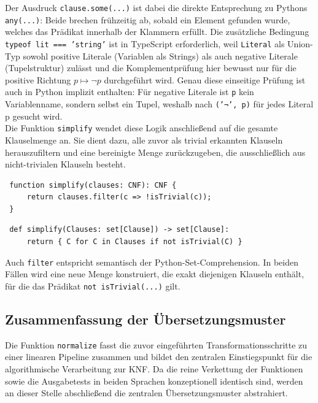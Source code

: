 Der Ausdruck \texttt{clause.some(...)} ist dabei die direkte Entsprechung zu Pythons \texttt{any(...)}: Beide brechen frühzeitig ab, sobald ein Element gefunden wurde, welches das Prädikat innerhalb der Klammern erfüllt. 
Die zusätzliche Bedingung \texttt{typeof lit === 'string'} ist in TypeScript erforderlich, weil \texttt{Literal} als Union-Typ sowohl positive Literale (Variablen als Strings) als auch negative Literale (Tupelstruktur) zulässt und die Komplementprüfung hier bewusst nur für die positive Richtung \(p \mapsto \neg p\) durchgeführt wird.
Genau diese einseitige Prüfung ist auch in Python implizit enthalten: Für negative Literale ist \texttt{p} kein Variablenname, sondern selbst ein Tupel, weshalb nach \texttt{('¬', p)} für jedes Literal p gesucht wird.\\
Die Funktion \texttt{simplify} wendet diese Logik anschließend auf die gesamte Klauselmenge an. Sie dient dazu, alle zuvor als trivial erkannten Klauseln herauszufiltern und eine bereinigte Menge zurückzugeben, die ausschließlich aus nicht-trivialen Klauseln besteht.

\begin{verbatim}
 function simplify(clauses: CNF): CNF {
     return clauses.filter(c => !isTrivial(c));
 }
\end{verbatim}

\begin{verbatim}
 def simplify(Clauses: set[Clause]) -> set[Clause]:
     return { C for C in Clauses if not isTrivial(C) }
\end{verbatim}

Auch \texttt{filter} entspricht semantisch der Python-Set-Comprehension. In beiden Fällen wird eine neue Menge konstruiert, die exakt diejenigen Klauseln enthält, für die das Prädikat \texttt{not isTrivial(...)} gilt.





\subsection{Zusammenfassung der Übersetzungsmuster}
Die Funktion \texttt{normalize} fasst die zuvor eingeführten Transformationsschritte zu einer linearen Pipeline zusammen und bildet den zentralen Einstiegspunkt für die algorithmische Verarbeitung zur \ac{KNF}. Da die reine Verkettung der Funktionen sowie die Ausgabetests in beiden Sprachen konzeptionell identisch sind, werden an dieser Stelle abschließend die zentralen Übersetzungsmuster abstrahiert. 

